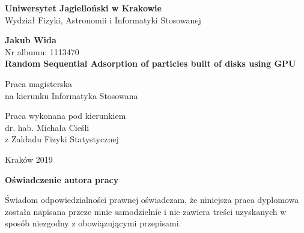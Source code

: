 \documentclass[12pt, oneside]{report}
\begin{document}
\thispagestyle{empty}
\begin{titlepage}
    \begin{center}

           \Large
	\textbf{Uniwersytet Jagielloński w Krakowie}\vspace{0.2cm}\\ Wydział Fizyki, Astronomii i Informatyki Stosowanej
               \vspace*{1cm}

         \vspace{3cm}
         \Large
          \textbf{Jakub Wida}\\\vspace{0.5cm}
         \normalsize Nr albumu: 1113470\\
             \vspace{2cm}
        \Huge
        \textbf{Random Sequential Adsorption of particles built of disks using GPU}

        \vspace{1.5cm}
        \normalsize
        Praca magisterska\\
        na kierunku Informatyka Stosowana\\ \vspace{0.15cm}

        \vfill
        \vspace{2cm}
       \begin{minipage}{1\textwidth}
\begin{flushright}
Praca wykonana pod kierunkiem\\
dr. hab. Michała Cieśli\\
z Zakładu Fizyki Statystycznej
\end{flushright}
\end{minipage}

        \vspace{2cm}
        \begin{center}
      Kraków 2019
        \end{center}
    \end{center}
\end{titlepage}

\newpage
 \thispagestyle{empty}
\vspace{2.5cm}
\begin{flushleft}
\large \textbf{Oświadczenie autora pracy}\vspace{0.6cm}\\
\end{flushleft}

\noindent Świadom odpowiedzialności prawnej oświadczam, że niniejsza praca dyplomowa została napisana przeze mnie samodzielnie i nie zawiera treści uzyskanych w sposób niezgodny z obowiązującymi przepisami.\\
\end{document}
